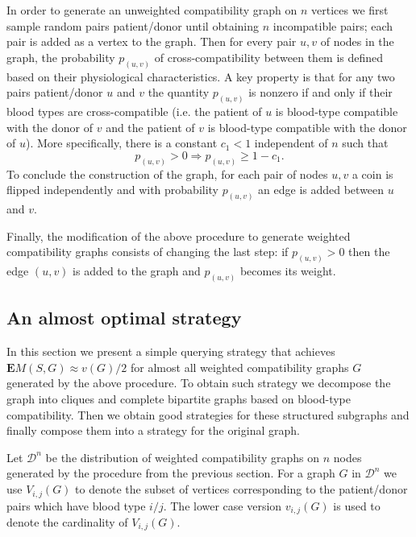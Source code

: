 \documentclass[12pt]{article}
\newcommand{\EMf}[2]{\mathbf{E}M(#1,#2)}
\begin{document}
		In order to generate an unweighted compatibility graph on $n$ vertices we first sample random pairs patient/donor until obtaining $n$ incompatible pairs; each pair is added as a vertex to the graph. Then for every pair $u, v$ of nodes in the graph, the probability $p_{(u,v)}$ of cross-compatibility between them is defined based on their physiological characteristics. A key property is that for any two pairs patient/donor $u$ and $v$ the quantity $p_{(u,v)}$ is nonzero if and only if their blood types are cross-compatible (i.e. the patient of $u$ is blood-type compatible with the donor of $v$ and the patient of $v$ is blood-type compatible with the donor of $u$). More specifically, there is a constant $c_1 < 1$ independent of $n$ such that 
\begin{equation}
			p_{(u,v)} > 0 \Rightarrow p_{(u,v)} \ge 1 - c_1. \label{LBprob}
		\end{equation}
	To conclude the construction of the graph, for each pair of nodes $u,v$ a coin is flipped independently and with probability $p_{(u,v)}$ an edge is added between $u$ and $v$. 
		
		Finally, the modification of the above procedure to generate weighted compatibility graphs consists of changing the last step: if $p_{(u,v)} > 0$ then the edge $(u,v)$ is added to the graph and $p_{(u,v)}$ becomes its weight.
		
		\subsection{An almost optimal strategy}

		In this section we present a simple querying strategy that achieves $\EMf{S}{G} \approx v(G)/2$ for almost all weighted compatibility graphs $G$ generated by the above procedure. To obtain such strategy we decompose the graph into cliques and complete bipartite graphs based on blood-type compatibility. Then we obtain good strategies for these structured subgraphs and finally compose them into a strategy for the original graph.
		
		Let $\mathcal{D}^n$ be the distribution of weighted compatibility graphs on $n$ nodes generated by the procedure from the previous section. For a graph $G$ in $\mathcal{D}^n$ we use $V_{i,j}(G)$ to denote the subset of vertices corresponding to the patient/donor pairs which have blood type $i/j$. The lower case version $v_{i,j}(G)$ is used to denote the cardinality of $V_{i,j}(G)$. 
		
\end{document}
